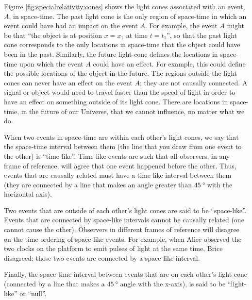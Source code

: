 Figure \ref{fig:specialrelativity:cones} shows the light cones associated with an event, $A$, in space-time. The past light cone is the only region of space-time in which an event could have had an impact on the event $A$. For example, the event $A$ might be that ``the object is at position $x=x_1$ at time $t=t_1$'', so that the past light cone corresponds to the only locations in space-time that the object could have been in the past. Similarly, the future light-cone defines the locations in space-time upon which the event $A$ could have an effect. For example, this could define the possible locations of the object in the future. The regions outside the light cones can never have an effect on the event $A$; they are not causally connected. A signal or object would need to travel faster than the speed of light in order to have an effect on something outside of its light cone. There are locations in space-time, in the future of our Universe, that we cannot influence, no matter what we do.

When two events in space-time are within each other's light cones, we say that the space-time interval between them (the line that you draw from one event to the other) is ``time-like''. Time-like events are such that all observers, in any frame of reference, will agree that one event happened before the other. Thus, events that are causally related must have a time-like interval between them (they are connected by a line that makes an angle greater than $\SI{45}{\degree}$ with the horizontal axis).

Two events that are outside of each other's light cones are said to be ``space-like''. Events that are connected by space-like intervals cannot be causally related (one cannot cause the other). Observers in different frames of reference will disagree on the time ordering of space-like events. For example, when Alice observed the two clocks on the platform to emit pulses of light at the same time, Brice disagreed; those two events are connected by a space-like interval.

Finally, the space-time interval between events that are on each other's light-cone (connected by a line that makes a $\SI{45}{\degree}$ angle with the x-axis), is said to be ``light-like'' or ``null''. 

